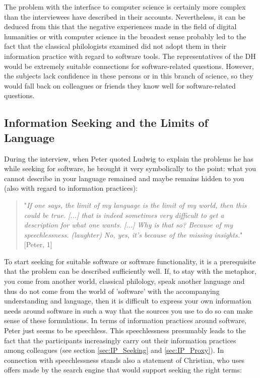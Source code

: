 \documentclass[12pt, a4paper, titlepage, oneside, abstract=true, toc=listof, toc=bibliography, BCOR=1cm]{scrreprt}
\begin{document}
{%
The problem with the interface to computer science is certainly more complex than the interviewees have described in their accounts. Nevertheless, it can be deduced from this that the negative experiences made in the field of digital humanities or with computer science in the broadest sense probably led to the fact that the classical philologists examined did not adopt them in their information practice with regard to software tools. The representatives of the DH would be extremely suitable connections for software-related questions. However, the subjects lack confidence in these persons or in this branch of science, so they would fall back on colleagues or friends they know well for software-related questions.

\subsection{Information Seeking and the Limits of Language}
\label{sec:seeking_language_limits}
During the interview, when Peter quoted Ludwig \citet{Wittgenstein1990} to explain the problems he has while seeking for software, he brought it very symbolically to the point: what you cannot describe in your language remained and maybe remains hidden to you (also with regard to information practices):

\begin{quotation}
"\textit{If one says, the limit of my language is the limit of my world, then this could be true. [...] that is indeed sometimes very difficult to get a description for what one wants. [...] Why is that so? Because of my speechlessness. (laughter) No, yes, it's because of the missing insights.}" [Peter, 1]
\end{quotation}

To start seeking for suitable software or software functionality, it is a prerequisite that the problem can be described sufficiently well. If, to stay with the metaphor, you come from another world, classical philology, speak another language and thus do not come from the world of 'software' with the accompanying understanding and language, then it is difficult to express your own information needs around software in such a way that the sources you use to do so can make sense of these formulations. In terms of information practices around software, Peter just seems to be speechless. This speechlessness presumably leads to the fact that the participants increasingly carry out their information practices among colleagues (see section \ref{sec:IP_Seeking} and \ref{sec:IP_Proxy}). In connection with speechlessness stands also a statement of Christian, who uses offers made by the search engine that would support seeking the right terms: 

}
\end{document}
